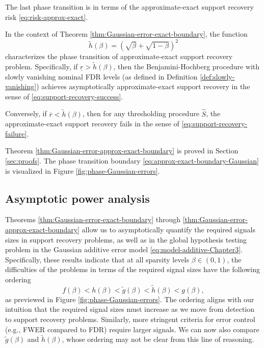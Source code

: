 The last phase transition is in terms of the approximate-exact support recovery risk
\eqref{eq:risk-approx-exact}.

\begin{theorem} \label{thm:Gaussian-error-approx-exact-boundary}
In the context of Theorem \ref{thm:Gaussian-error-exact-boundary}, the function 
\begin{equation} \label{eq:approx-exact-boundary-Gaussian}
    \widetilde{h}(\beta) = \left(\sqrt{\beta} + \sqrt{1-\beta}\right)^2
\end{equation}
characterizes the phase transition of approximate-exact support recovery problem.
Specifically, if $\underline{r} > \widetilde{h}(\beta)$, then the Benjamini-Hochberg procedure with slowly vanishing nominal FDR levels (as defined in Definition \ref{def:slowly-vanishing}) achieves asymptotically approximate-exact support recovery in the sense of \eqref{eq:support-recovery-success}. 

Conversely, if $\overline{r} < \widetilde{h}(\beta)$, then for any thresholding procedure $\widehat{S}$, the approximate-exact support recovery fails in the sense of \eqref{eq:support-recovery-failure}.
\end{theorem}

Theorem \ref{thm:Gaussian-error-approx-exact-boundary} is proved in Section \ref{sec:proofs}.
The phase transition boundary \eqref{eq:approx-exact-boundary-Gaussian} is visualized in Figure \ref{fig:phase-Gaussian-errors}.


\subsection{Asymptotic power analysis}
\label{subsec:power-analysis}

Theorems \ref{thm:Gaussian-error-exact-boundary} through \ref{thm:Gaussian-error-approx-exact-boundary} allow us to asymptotically quantify the required signals sizes in support recovery problems, as well as in the global hypothesis testing problem in the Gaussian additive error model \eqref{eq:model-additive-Chapter3}. 
Specifically, these results indicate that at all sparsity levels $\beta\in(0,1)$, the difficulties of the problems in terms of the required signal sizes have the following ordering
$$
f(\beta) < h(\beta) < \widetilde{g}(\beta) < \widetilde{h}(\beta) < g(\beta),
$$
as previewed in Figure \ref{fig:phase-Gaussian-errors}.
The ordering aligns with our intuition that the required signal sizes must increase as we move from detection to support recovery problems.
Similarly, more stringent criteria for error control (e.g., FWER compared to FDR) require larger signals.
We can now also compare $\widetilde{g}(\beta)$ and $\widetilde{h}(\beta)$, whose ordering may not be clear from this line of reasoning.


